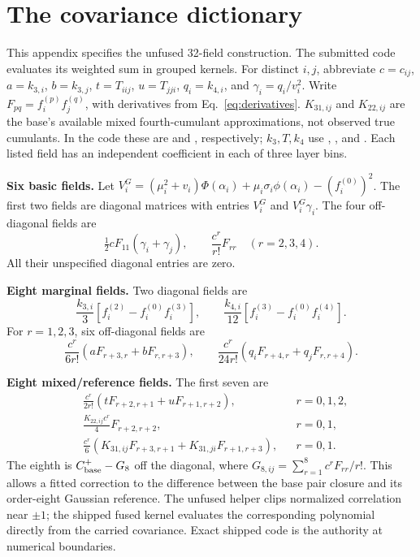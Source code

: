 \clearpage\appendix
\section{The covariance dictionary}\label{app:dictionary}
This appendix specifies the unfused 32-field construction. The submitted code
evaluates its weighted sum in grouped kernels. For distinct \(i,j\), abbreviate
\(c=c_{ij}\), \(a=k_{3,i}\), \(b=k_{3,j}\), \(t=T_{iij}\),
\(u=T_{jji}\), \(q_i=k_{4,i}\), and \(\gamma_i=q_i/v_i^2\).
Write \(F_{pq}=f_i^{(p)}f_j^{(q)}\), with derivatives from
Eq.~\eqref{eq:derivatives}. \(K_{31,ij}\) and \(K_{22,ij}\) are the base's
available mixed fourth-cumulant approximations, not observed true cumulants.
In the code these are  and , respectively;
\(k_3,T,k_4\) use , , and .
Each listed field has an independent coefficient in each of three layer bins.

\textbf{Six basic fields.} Let
\(V_i^G=(\mu_i^2+v_i)\Phi(\alpha_i)+\mu_i\sigma_i\phi(\alpha_i)
 -(f_i^{(0)})^2\). The first two fields are diagonal matrices with entries
\(V_i^G\) and \(V_i^G\gamma_i\). The four off-diagonal fields are
\begin{equation}
 \tfrac12 c F_{11}(\gamma_i+\gamma_j),\qquad
 \frac{c^r}{r!}F_{rr}\quad(r=2,3,4).
\end{equation}
All their unspecified diagonal entries are zero.

\textbf{Eight marginal fields.} Two diagonal fields are
\begin{equation}
 \frac{k_{3,i}}3[f_i^{(2)}-f_i^{(0)}f_i^{(3)}],\qquad
 \frac{k_{4,i}}{12}[f_i^{(3)}-f_i^{(0)}f_i^{(4)}].
\end{equation}
For \(r=1,2,3\), six off-diagonal fields are
\begin{equation}
 \frac{c^r}{6r!}(aF_{r+3,r}+bF_{r,r+3}),\qquad
 \frac{c^r}{24r!}(q_iF_{r+4,r}+q_jF_{r,r+4}).
\end{equation}

\textbf{Eight mixed/reference fields.} The first seven are
\begin{align}
 &\frac{c^r}{2r!}(tF_{r+2,r+1}+uF_{r+1,r+2}),&&r=0,1,2,\nonumber\\
 &\frac{K_{22,ij}c^r}{4}F_{r+2,r+2},&&r=0,1,\nonumber\\
 &\frac{c^r}{6}(K_{31,ij}F_{r+3,r+1}+K_{31,ji}F_{r+1,r+3}),&&r=0,1.
\end{align}
The eighth is \(C^+_{\rm base}-G_8\) off the diagonal, where
\(G_{8,ij}=\sum_{r=1}^{8}c^rF_{rr}/r!\). This allows a fitted correction to
the difference between the base pair closure and its order-eight Gaussian
reference. The unfused helper clips normalized correlation near \(\pm1\);
the shipped fused kernel evaluates the corresponding polynomial directly
from the carried covariance. Exact shipped code is the authority at numerical
boundaries.

